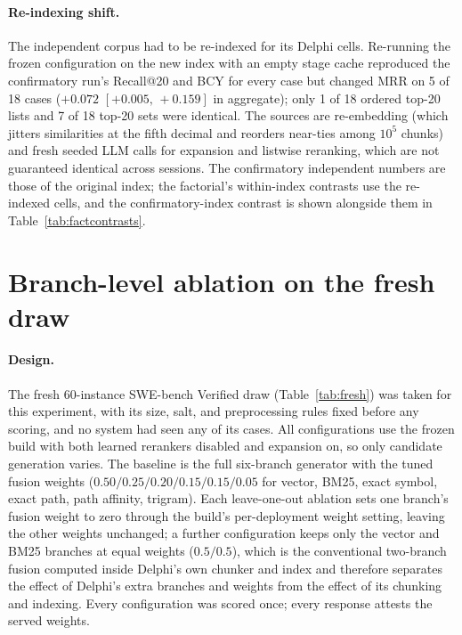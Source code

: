 \documentclass{article}
\newcommand{\ci}[2]{{\footnotesize$[#1,\,#2]$}}
\newcommand{\system}{Delphi}
\begin{document}
\paragraph{Re-indexing shift.} The independent corpus had to be re-indexed for its \system{} cells. Re-running the frozen configuration on the new index with an empty stage cache reproduced the confirmatory run's Recall@20 and BCY for every case but changed MRR on 5 of 18 cases ($+0.072$ \ci{+0.005}{+0.159} in aggregate); only 1 of 18 ordered top-20 lists and 7 of 18 top-20 sets were identical. The sources are re-embedding (which jitters similarities at the fifth decimal and reorders near-ties among $10^{5}$ chunks) and fresh seeded LLM calls for expansion and listwise reranking, which are not guaranteed identical across sessions. The confirmatory independent numbers are those of the original index; the factorial's within-index contrasts use the re-indexed cells, and the confirmatory-index contrast is shown alongside them in Table~\ref{tab:factcontrasts}.

\section{Branch-level ablation on the fresh draw}
\label{app:branches}

\paragraph{Design.} The fresh 60-instance SWE-bench Verified draw (Table~\ref{tab:fresh}) was taken for this experiment, with its size, salt, and preprocessing rules fixed before any scoring, and no system had seen any of its cases. All configurations use the frozen build with both learned rerankers disabled and expansion on, so only candidate generation varies. The baseline is the full six-branch generator with the tuned fusion weights ($0.50/0.25/0.20/0.15/0.15/0.05$ for vector, BM25, exact symbol, exact path, path affinity, trigram). Each leave-one-out ablation sets one branch's fusion weight to zero through the build's per-deployment weight setting, leaving the other weights unchanged; a further configuration keeps only the vector and BM25 branches at equal weights ($0.5/0.5$), which is the conventional two-branch fusion computed inside \system{}'s own chunker and index and therefore separates the effect of \system{}'s extra branches and weights from the effect of its chunking and indexing. Every configuration was scored once; every response attests the served weights.
\end{document}
